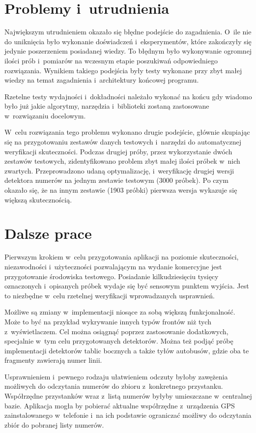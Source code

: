 \section{Problemy i~utrudnienia}

Największym utrudnieniem okazało się błędne podejście do zagadnienia. 
O~ile nie do uniknięcia było wykonanie doświadczeń i~eksperymentów,
które zakończyły się jedynie poszerzeniem posiadanej wiedzy.
To błędnym było wykonywanie ogromnej ilości prób i~pomiarów na
wczesnym etapie poszukiwań odpowiedniego rozwiązania. 
Wynikiem takiego podejścia były testy wykonane przy zbyt małej 
wiedzy na temat zagadnienia i~architektury końcowej programu. 

Rzetelne testy wydajności i~dokładności należało wykonać na końcu
gdy wiadomo było już jakie algorytmy, narzędzia i~biblioteki zostaną
zastosowane w~rozwiązaniu docelowym. 

W~celu rozwiązania tego problemu wykonano drugie podejście,
głównie skupiając się na przygotowaniu zestawów danych testowych
i~narzędzi do automatycznej weryfikacji skuteczności.
Podczas drugiej próby, przez wykorzystanie dwóch zestawów
testowych, zidentyfikowano problem zbyt małej ilości próbek w~nich
zwartych. Przeprowadzono udaną optymalizację,
i~weryfikację drugiej wersji detektora
numerów na jednym zestawie testowym (3000 próbek). Po czym okazało się, że na
innym zestawie (1903 próbki) pierwsza wersja wykazuje się większą 
skutecznością. 

\section{Dalsze prace}

Pierwszym krokiem w~celu przygotowania aplikacji na poziomie 
skuteczności, niezawodności i~użyteczności pozwalającym na 
wydanie komercyjne jest przygotowanie środowiska testowego.
Posiadanie kilkudziesięciu tysięcy oznaczonych i~opisanych
próbek wydaje się być sensowym punktem wyjścia.
Jest to niezbędne w~celu rzetelnej weryfikacji wprowadzanych 
usprawnień.

Możliwe są zmiany w~implementacji niosące za sobą większą funkcjonalność.
Może to być na przykład wykrywanie innych typów frontów niż 
tych z~wyświetlaczem. Cel można osiągnąć poprzez zastosowanie 
dodatkowych, specjalnie w~tym celu przygotowanych detektorów. Można też 
podjąć próbę implementacji detektorów tablic bocznych a także tyłów 
autobusów, gdzie oba te fragmenty zawierają numer linii.

Usprawnieniem i~pewnego rodzaju ułatwieniem odczuty byłoby zawężenia
możliwych do odczytania numerów do zbioru z~konkretnego przystanku. 
Współrzędne przystanków wraz z~listą numerów byłyby umieszczane 
w~centralnej bazie. Aplikacja mogła by pobierać aktualne 
współrzędne z~urządzenia GPS zainstalowanego w~telefonie i~na ich podstawie
ograniczać możliwy do odczytania zbiór do pobranej listy numerów.

